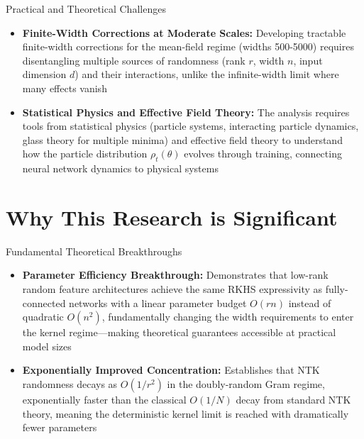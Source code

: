 \documentclass[aspectratio=169]{beamer}
\begin{document}
\begin{frame}{Practical and Theoretical Challenges}
\begin{itemize}
\item \textbf{Finite-Width Corrections at Moderate Scales:} Developing tractable finite-width corrections for the mean-field regime (widths 500-5000) requires disentangling multiple sources of randomness (rank $r$, width $n$, input dimension $d$) and their interactions, unlike the infinite-width limit where many effects vanish
\item \textbf{Statistical Physics and Effective Field Theory:} The analysis requires tools from statistical physics (particle systems, interacting particle dynamics, glass theory for multiple minima) and effective field theory to understand how the particle distribution $\rho_t(\theta)$ evolves through training, connecting neural network dynamics to physical systems
\end{itemize}
\end{frame}

\section{Why This Research is Significant}

\begin{frame}{Fundamental Theoretical Breakthroughs}
\begin{itemize}
\item \textbf{Parameter Efficiency Breakthrough:} Demonstrates that low-rank random feature architectures achieve the same RKHS expressivity as fully-connected networks with a linear parameter budget $O(rn)$ instead of quadratic $O(n^2)$, fundamentally changing the width requirements to enter the kernel regime—making theoretical guarantees accessible at practical model sizes
\item \textbf{Exponentially Improved Concentration:} Establishes that NTK randomness decays as $O(1/r^2)$ in the doubly-random Gram regime, exponentially faster than the classical $O(1/N)$ decay from standard NTK theory, meaning the deterministic kernel limit is reached with dramatically fewer parameters
\end{itemize}
\end{frame}
\end{document}
